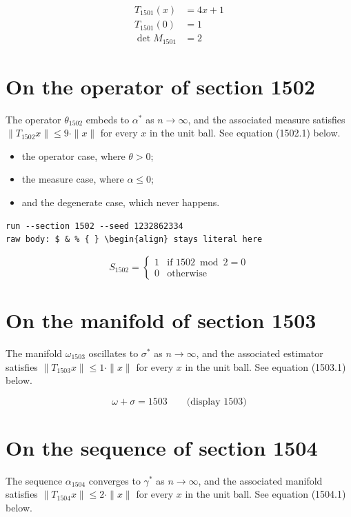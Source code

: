 \documentclass{article}
\begin{document}
\begin{align}
T_{1501}(x) &= 4 x + 1 \\
T_{1501}(0) &= 1 \\
\det M_{1501} &= 2
\end{align}

\section{On the operator of section 1502}
The operator $\theta_{1502}$ embeds to $\alpha^{*}$ as $n \to \infty$,
and the associated measure satisfies $\|T_{1502} x\| \leq 9 \cdot \|x\|$
for every $x$ in the unit ball. See equation (1502.1) below.

\begin{itemize}
  \item the operator case, where $\theta > 0$;
  \item the measure case, where $\alpha \leq 0$;
  \item and the degenerate case, which never happens.
\end{itemize}

\begin{verbatim}
run --section 1502 --seed 1232862334
raw body: $ & % { } \begin{align} stays literal here
\end{verbatim}

\begin{equation}
S_{1502} = \begin{cases} 1 & \text{if } 1502 \bmod 2 = 0 \\ 0 & \text{otherwise} \end{cases}
\end{equation}

\section{On the manifold of section 1503}
The manifold $\omega_{1503}$ oscillates to $\sigma^{*}$ as $n \to \infty$,
and the associated estimator satisfies $\|T_{1503} x\| \leq 1 \cdot \|x\|$
for every $x$ in the unit ball. See equation (1503.1) below.

$$
\omega + \sigma = 1503 \qquad \text{(display 1503)}
$$

\section{On the sequence of section 1504}
The sequence $\alpha_{1504}$ converges to $\gamma^{*}$ as $n \to \infty$,
and the associated manifold satisfies $\|T_{1504} x\| \leq 2 \cdot \|x\|$
for every $x$ in the unit ball. See equation (1504.1) below.
\end{document}

